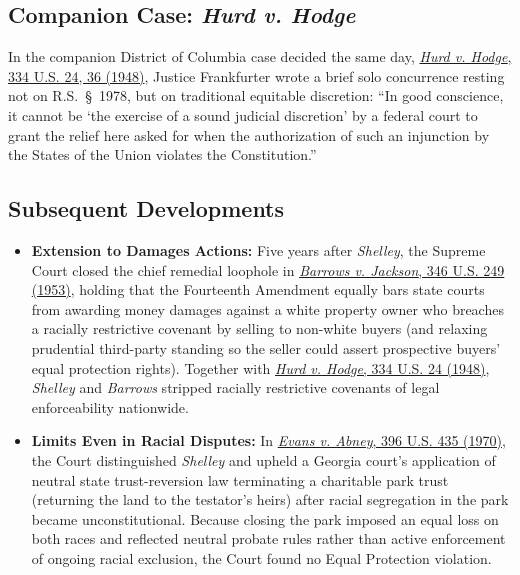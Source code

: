 \documentclass[12pt]{article}
\begin{document}
\subsection{Companion Case: \textit{Hurd v. Hodge}}

In the companion District of Columbia case decided the same day, \href{https://supreme.justia.com/cases/federal/us/334/24/}{\textit{Hurd v. Hodge}, 334 U.S. 24, 36 (1948)}, Justice Frankfurter wrote a brief solo concurrence resting not on R.S.~\S~1978, but on traditional equitable discretion: ``In good conscience, it cannot be `the exercise of a sound judicial discretion' by a federal court to grant the relief here asked for when the authorization of such an injunction by the States of the Union violates the Constitution.''

\subsection{Subsequent Developments}

\begin{itemize}

\item \textbf{Extension to Damages Actions:} Five years after \textit{Shelley}, the Supreme Court closed the chief remedial loophole in \href{https://supreme.justia.com/cases/federal/us/346/249/}{\textit{Barrows v. Jackson}, 346 U.S. 249 (1953)}, holding that the Fourteenth Amendment equally bars state courts from awarding money damages against a white property owner who breaches a racially restrictive covenant by selling to non-white buyers (and relaxing prudential third-party standing so the seller could assert prospective buyers' equal protection rights). Together with \href{https://supreme.justia.com/cases/federal/us/334/24/}{\textit{Hurd v. Hodge}, 334 U.S. 24 (1948)}, \textit{Shelley} and \textit{Barrows} stripped racially restrictive covenants of legal enforceability nationwide.

\item \textbf{Limits Even in Racial Disputes:} In \href{https://supreme.justia.com/cases/federal/us/396/435/}{\textit{Evans v. Abney}, 396 U.S. 435 (1970)}, the Court distinguished \textit{Shelley} and upheld a Georgia court's application of neutral state trust-reversion law terminating a charitable park trust (returning the land to the testator's heirs) after racial segregation in the park became unconstitutional. Because closing the park imposed an equal loss on both races and reflected neutral probate rules rather than active enforcement of ongoing racial exclusion, the Court found no Equal Protection violation.

\end{itemize}
\end{document}
